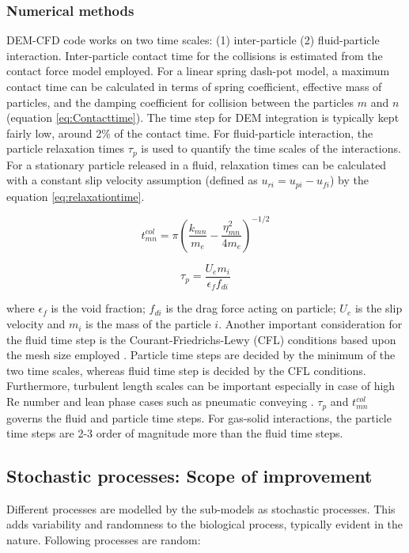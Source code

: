 \documentclass[11pt,a4paper,openright]{article}
\begin{document}
\subsubsection{Numerical methods \label{sec:TMS}}
DEM-CFD code works on two time scales: (1) inter-particle (2) fluid-particle interaction. Inter-particle contact time for the collisions is estimated from the contact force model employed. For a linear spring dash-pot model, a maximum contact time can be calculated in terms of spring coefficient, effective mass of particles, and the damping coefficient for collision between the particles $m$ and $n$ (equation \ref{eq:Contacttime}). The time step for DEM integration is typically kept fairly low, around 2\% of the contact time. For fluid-particle interaction, the particle relaxation times $\tau_{p}$ is used to quantify the time scales of the interactions. For a stationary particle released in a fluid, relaxation times can be calculated with a constant slip velocity assumption (defined as $u_{ri} = u_{pi}-u_{fi}$) by the equation \ref{eq:relaxationtime}.

 \begin{equation}
 \label{eq:Contacttime}
 t_{mn}^{col} = \pi\left ( \frac{k_{mn}}{m_{e}} - \frac{\eta_{mn}^{2}}{4m_{e}}\right )^{-1/2}
 \end{equation}

 \begin{equation}
 \label{eq:relaxationtime}
 \tau_{p} = \frac{U_{e}m_{i}}{\epsilon_{f} f_{di}}
 \end{equation}

where $\epsilon_{f}$ is the void fraction; $f_{di}$ is the drag force acting on particle; $U_{e}$ is the slip velocity and $m_{i}$ is the mass of the particle $i$. Another important consideration for the fluid time step is the Courant-Friedrichs-Lewy (CFL) conditions based upon the mesh size employed \citep{xiao2011algorithms}. Particle time steps are decided by the minimum of the two time scales, whereas fluid time step is decided by the CFL conditions. Furthermore, turbulent length scales can be important especially in case of high Re number and lean phase cases such as pneumatic conveying \cite{sommerfeld2003analysis}. $\tau_p$ and $t_{mn}^{col}$ governs the fluid and particle time steps. For gas-solid interactions, the particle time steps are 2-3 order of magnitude more than the fluid time steps. 


\subsection{Stochastic processes: Scope of improvement}
Different processes are modelled by the sub-models as stochastic processes. This adds variability and randomness to the biological process, typically evident in the nature. Following processes are random:
\end{document}
